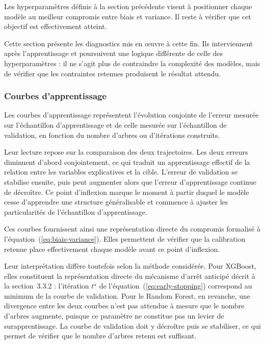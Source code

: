 Les hyperparamètres définis à la section précédente visent à positionner chaque modèle au 
meilleur compromis entre biais et variance. Il reste à vérifier que cet objectif est 
effectivement atteint.

Cette section présente les diagnostics mis en œuvre à cette fin. Ils interviennent après 
l'apprentissage et poursuivent une logique différente de celle des hyperparamètres : il 
ne s'agit plus de contraindre la complexité des modèles, mais de vérifier que les 
contraintes retenues produisent le résultat attendu.

\subsubsection{Courbes d'apprentissage}

Les courbes d'apprentissage représentent l'évolution conjointe de l'erreur mesurée sur 
l'échantillon d'apprentissage et de celle mesurée sur l'échantillon de validation, en 
fonction du nombre d'arbres ou d'itérations construits.

Leur lecture repose sur la comparaison des deux trajectoires. Les deux erreurs diminuent 
d'abord conjointement, ce qui traduit un apprentissage effectif de la relation entre les 
variables explicatives et la cible. L'erreur de validation se stabilise ensuite, puis peut 
augmenter alors que l'erreur d'apprentissage continue de décroître. Ce point d'inflexion 
marque le moment à partir duquel le modèle cesse d'apprendre une structure généralisable 
et commence à ajuster les particularités de l'échantillon d'apprentissage.

Ces courbes fournissent ainsi une représentation directe du compromis formalisé à 
l'équation~(\ref{eq:biais-variance}). Elles permettent de vérifier que la calibration 
retenue place effectivement chaque modèle avant ce point d'inflexion.

Leur interprétation diffère toutefois selon la méthode considérée. Pour XGBoost, elles 
constituent la représentation directe du mécanisme d'arrêt anticipé décrit à la 
section~3.3.2 : l'itération $t^{\star}$ de l'équation~(\ref{eq:early-stopping}) 
correspond au minimum de la courbe de validation. Pour le Random Forest, en revanche, une 
divergence entre les deux courbes n'est pas attendue à mesure que le nombre d'arbres 
augmente, puisque ce paramètre ne constitue pas un levier de surapprentissage. La courbe 
de validation doit y décroître puis se stabiliser, ce qui permet de vérifier que le 
nombre d'arbres retenu est suffisant.

